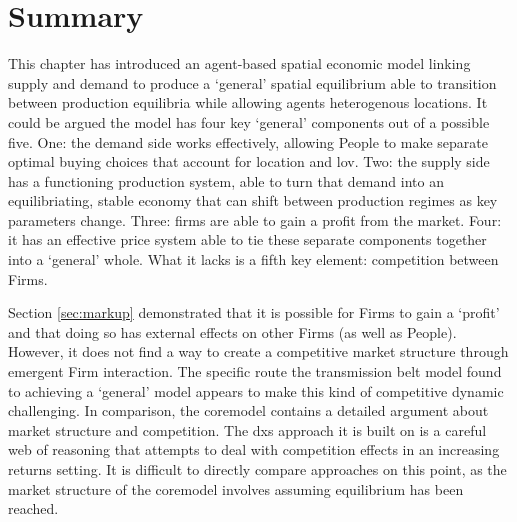 \section{Summary \label{sec:tbconc}}

This chapter has introduced an agent-based spatial economic model linking supply and demand to produce a `general' spatial equilibrium able to transition between production equilibria while allowing agents heterogenous locations. It could be argued the model has four key `general' components out of a possible five. One: the demand side works effectively, allowing People to make separate optimal buying choices that account for location and \gls{lov}. Two: the supply side has a functioning production system, able to turn that demand into an equilibriating, stable economy that can shift between production regimes as key parameters change. Three: firms are able to gain a profit from the market. Four: it has an effective price system able to tie these separate components together into a `general' whole. What it lacks is a fifth key element: competition between Firms.

Section \ref{sec:markup} demonstrated that it is possible for Firms to gain a `profit' and that doing so has external effects on other Firms (as well as People). However, it does not find a way to create a competitive market structure through emergent Firm interaction. The specific route the transmission belt model found to achieving a `general' model appears to make this kind of competitive dynamic challenging. In comparison, the \gls{coremodel} contains a detailed argument about market structure and competition. The \gls{dxs} approach it is built on is a careful web of reasoning that attempts to deal with competition effects in an increasing returns setting. It is difficult to directly compare approaches on this point, as the market structure of the \gls{coremodel} involves assuming equilibrium has been reached. 

